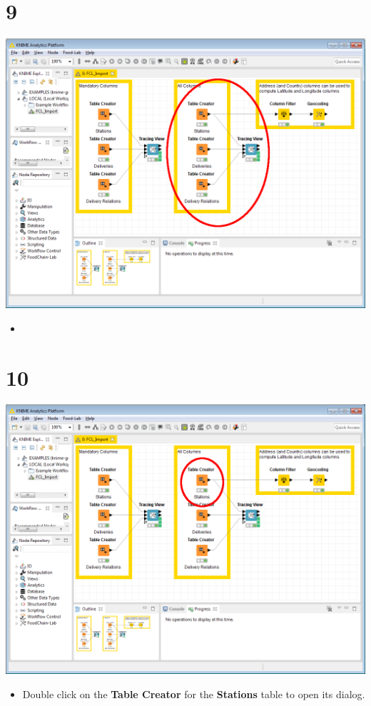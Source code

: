 \documentclass{beamer}
\begin{document}
\section{9}
\begin{frame}
	\begin{center}
  		\includegraphics[height=0.6\textheight]{9.png}
	\end{center}
	\begin{itemize}
		\item
	\end{itemize}
\end{frame}

\section{10}
\begin{frame}
	\begin{center}
  		\includegraphics[height=0.6\textheight]{10.png}
	\end{center}
	\begin{itemize}
		\item Double click on the \textbf{Table Creator} for the \textbf{Stations} table to open its dialog.
	\end{itemize}
\end{frame}
\end{document}

